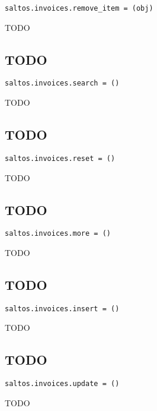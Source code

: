 \documentclass[a4paper]{book}
\begin{document}
\begin{lstlisting}
saltos.invoices.remove_item = (obj)
\end{lstlisting}

TODO

\hypertarget{toc82}{}
\subsection{TODO}

\begin{lstlisting}
saltos.invoices.search = ()
\end{lstlisting}

TODO

\hypertarget{toc83}{}
\subsection{TODO}

\begin{lstlisting}
saltos.invoices.reset = ()
\end{lstlisting}

TODO

\hypertarget{toc84}{}
\subsection{TODO}

\begin{lstlisting}
saltos.invoices.more = ()
\end{lstlisting}

TODO

\hypertarget{toc85}{}
\subsection{TODO}

\begin{lstlisting}
saltos.invoices.insert = ()
\end{lstlisting}

TODO

\hypertarget{toc86}{}
\subsection{TODO}

\begin{lstlisting}
saltos.invoices.update = ()
\end{lstlisting}

TODO

\hypertarget{toc87}{}
\end{document}
